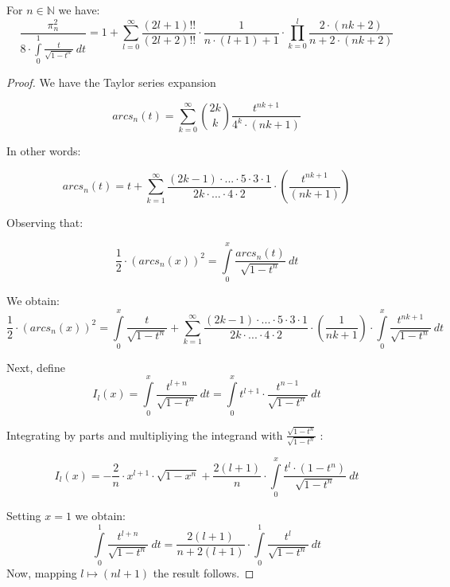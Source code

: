 \documentclass[10pt,a4paper]{amsart}
\begin{document}
\begin{theorem}
For $n \in \mathbb{N}$ we have: \\
\begin{equation}
\frac{\pi_{n}^{2}}{8 \cdot \int \limits_{0}^{1} \frac{t}{\sqrt{1 - t^n}} \ dt} = 1 + \sum \limits_{l=0}^{\infty} \frac{(2l+1)!!}{(2l+2)!!} \cdot \frac{1}{n \cdot (l+1) + 1} \cdot \prod \limits_{k=0}^{l} \frac{2 \cdot (nk+2)}{n + 2 \cdot (nk+2)}
\end{equation}
\end{theorem}

\begin{proof}

We have the Taylor series expansion

\begin{equation}
arcs_n(t) = \sum_{k=0}^{\infty} \binom{2k}{k} \frac{t^{nk+1}}{4^{k} \cdot (nk+1)}
\end{equation}

In other words:

\begin{equation}
arcs_n(t) = t + \sum \limits_{k=1}^{\infty} \frac{(2k-1) \cdot ... \cdot 5 \cdot 3 \cdot 1}{2k \cdot ... \cdot 4 \cdot 2} \cdot (\frac{t^{nk+1}}{(nk+1)})
\end{equation}

Observing that:

\begin{equation}
\frac{1}{2} \cdot (arcs_n(x))^2 = \int \limits_{0}^{x} \frac{arcs_n(t)}{\sqrt{1 - t^n}} \ dt
\end{equation}

We obtain: 
\begin{equation}
\frac{1}{2} \cdot (arcs_n(x))^2 =\int \limits_{0}^{x} \frac{t}{\sqrt{1 - t^n}} + \sum \limits_{k=1}^{\infty} \frac{(2k-1) \cdot ... \cdot 5 \cdot 3 \cdot 1}{2k \cdot ... \cdot 4 \cdot 2} \cdot (\frac{1}{nk+1}) \cdot \int \limits_{0}^{x} \frac{t^{nk+1}}{\sqrt{1 - t^n}} \ dt
\end{equation}

Next, define
\begin{equation}
I_l(x) = \int \limits_{0}^{x} \frac{t^{l + n}}{\sqrt{1-t^n}} \ dt = \int \limits_{0}^{x} t^{l + 1} \cdot \frac{t^{n-1}}{\sqrt{1 - t^n}} \ dt
\end{equation}

Integrating by parts and multipliying the integrand with $\frac{\sqrt{1-t^n}}{\sqrt{1-t^n}}$ : 

\begin{equation}
I_l(x) = - \frac{2}{n} \cdot x^{l+1} \cdot \sqrt{1 - x^n} + \frac{2(l+1)}{n} \cdot \int \limits_{0}^{x} \frac{t^{l} \cdot (1 - t^n)}{\sqrt{1-t^n}} \ dt
\end{equation}

Setting $x = 1$ we obtain:
\begin{equation}
\int \limits_{0}^{1} \frac{t^{l+n}}{\sqrt{1-t^n}} \ dt = \frac{2(l+1)}{n+2(l+1)} \cdot \int \limits_{0}^{1} \frac{t^{l}}{\sqrt{1-t^n}} \ dt
\end{equation}
Now, mapping $l \mapsto (nl+1)$ the result follows.

\end{proof}
\end{document}
